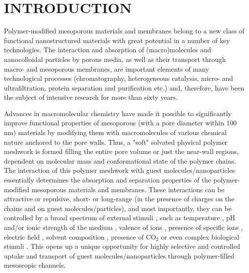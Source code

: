 \documentclass[12pt, a4paper]{article}
\begin{document}
\section{INTRODUCTION}


Polymer-modified mesoporous materials and membranes belong to a new class of functional nanostructured materials with great potential in a number of key technologies. 
The interaction and absorption of (macro)molecules and nanocolloidal particles by porous media, as well as their transport through macro- and mesoporous membranes, are important elements of many technological processes (chromatography, heterogeneous catalysis, micro- and ultrafiltration, protein separation and purification etc.) and, therefore, have been the subject of intensive research for more than sixty years.\cite{Watson1959, Rout2003, Huang2023, Uredat2024}

Advances in macromolecular chemistry have made it possible to significantly improve functional properties of mesoporous (with a pore diameter within 100 nm) 
materials by modifying them with macromolecules of various chemical nature anchored to  the pore walls. Thus, a "soft" solvated physical polymer meshwork is formed filling the entire pore volume or just the near-wall regions, dependent on molecular mass and conformational state of the polymer chains.
The interaction of this polymer meshwork with guest molecules/nanoparticles 
essentially determines the absorption and separation properties of the polymer-modified mesoporous materials and membranes. 
These interactions can be attractive or repulsive, short- or long-range (in the presence of charges on the chains and on guest molecules/particles), and most importantly, 
they can be controlled by a broad spectrum of external stimuli \cite{Jeong2002, Lee2010, Low2019}, 
such as temperature                     \cite{Stetsyshyn2020}, 
pH and/or ionic strength of the medium  \cite{Dai2008, Zhang2005}, 
valence of ions                         \cite{Zhulina1999}, 
presence of specific ions               \cite{Robertson2021}, 
electric field                          \cite{Lokuge2005}, 
solvent composition                     \cite{Halperin2011}, 
presence of $\text{CO}_2$               \cite{Darabi2016} 
or even complex biological stimuli      \cite{Ikeda2010, Lu2003}.
This opens up a unique opportunity for highly selective and controlled uptake and transport of guest molecules/nanoparticles through polymer-filled mesoscopic channels. 
\end{document}
